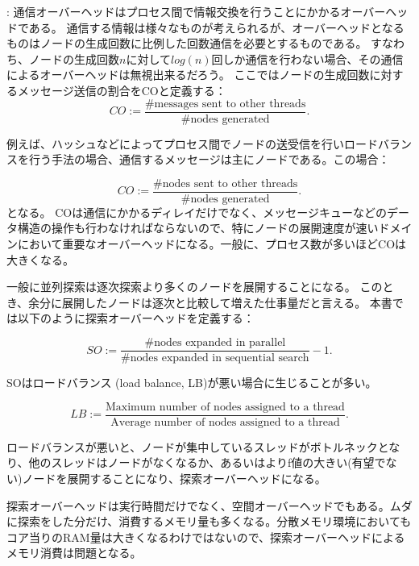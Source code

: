 \documentclass{report}
\begin{document}
:
通信オーバーヘッドはプロセス間で情報交換を行うことにかかるオーバーヘッドである。
通信する情報は様々なものが考えられるが、オーバーヘッドとなるものはノードの生成回数に比例した回数通信を必要とするものである。
すなわち、ノードの生成回数$n$に対して$log(n)$回しか通信を行わない場合、その通信によるオーバーヘッドは無視出来るだろう。
ここではノードの生成回数に対するメッセージ送信の割合をCOと定義する：
\begin{equation}
	CO := \frac{\text{\# messages sent to other threads}}{\text{\# nodes generated}}.
\end{equation}

例えば、ハッシュなどによってプロセス間でノードの送受信を行いロードバランスを行う手法の場合、通信するメッセージは主にノードである。この場合：

\begin{equation}
	CO := \frac{\text{\# nodes sent to other threads}}{\text{\# nodes generated}}.
\end{equation}
となる。
COは通信にかかるディレイだけでなく、メッセージキューなどのデータ構造の操作も行わなければならないので、特にノードの展開速度が速いドメインにおいて重要なオーバーヘッドになる。一般に、プロセス数が多いほどCOは大きくなる。


一般に並列探索は逐次探索より多くのノードを展開することになる。
このとき、余分に展開したノードは逐次と比較して増えた仕事量だと言える。
本書では以下のように探索オーバーヘッドを定義する：

\begin{equation}
SO := \frac{\text{\# nodes expanded in parallel}}{\text{\#nodes expanded in sequential search}} - 1.
\end{equation}

SOはロードバランス (load balance, LB)が悪い場合に生じることが多い。

\begin{equation}
LB := \frac{\text{Maximum number of nodes assigned to a thread}}{\text{Average number of nodes assigned to a thread}}.
\end{equation}

ロードバランスが悪いと、ノードが集中しているスレッドがボトルネックとなり、他のスレッドはノードがなくなるか、あるいはよりf値の大きい(有望でない)ノードを展開することになり、探索オーバーヘッドになる。

探索オーバーヘッドは実行時間だけでなく、空間オーバーヘッドでもある。ムダに探索をした分だけ、消費するメモリ量も多くなる。分散メモリ環境においてもコア当りのRAM量は大きくなるわけではないので、探索オーバーヘッドによるメモリ消費は問題となる。
\end{document}
